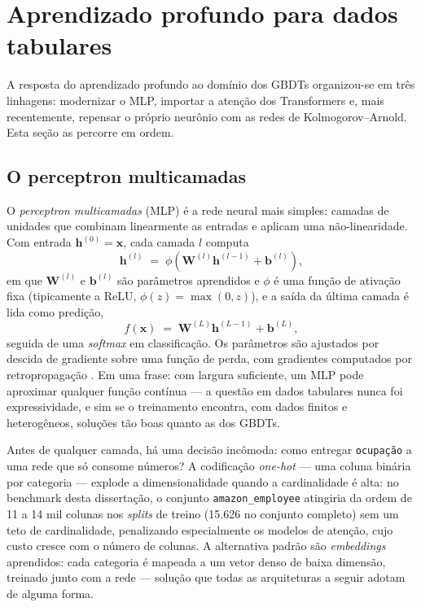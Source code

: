\section{Aprendizado profundo para dados tabulares}
\label{sec:fund-dl}

A resposta do aprendizado profundo ao domínio dos GBDTs organizou-se em
três linhagens: modernizar o MLP, importar a atenção dos Transformers e,
mais recentemente, repensar o próprio neurônio com as redes de
Kolmogorov--Arnold. Esta seção as percorre em ordem.

\subsection{O perceptron multicamadas}

O \emph{perceptron multicamadas} (MLP) é a rede neural mais simples:
camadas de unidades que combinam linearmente as entradas e aplicam uma
não-linearidade. Com entrada $\mathbf{h}^{(0)} = \mathbf{x}$, cada camada
$l$ computa
\begin{equation}
  \mathbf{h}^{(l)} \;=\; \phi\!\left(\mathbf{W}^{(l)} \mathbf{h}^{(l-1)}
  + \mathbf{b}^{(l)}\right),
  \label{eq:mlp-camada}
\end{equation}
em que $\mathbf{W}^{(l)}$ e $\mathbf{b}^{(l)}$ são parâmetros aprendidos e
$\phi$ é uma função de ativação fixa (tipicamente a ReLU,
$\phi(z) = \max(0, z)$), e a saída da última camada é lida como predição,
\begin{equation}
  f(\mathbf{x}) \;=\; \mathbf{W}^{(L)} \mathbf{h}^{(L-1)} + \mathbf{b}^{(L)},
  \label{eq:mlp-saida}
\end{equation}
seguida de uma \emph{softmax} em classificação. Os parâmetros são ajustados
por descida de gradiente sobre uma função de perda, com gradientes
computados por retropropagação \citep{rumelhart1986}. Em uma frase: com largura suficiente, um
MLP pode aproximar qualquer função contínua \citep{hornik1989} --- a questão em dados
tabulares nunca foi expressividade, e sim se o treinamento encontra, com
dados finitos e heterogêneos, soluções tão boas quanto as dos GBDTs.

Antes de qualquer camada, há
uma decisão incômoda: como entregar \texttt{ocupação} a uma rede que só
consome números? A codificação \emph{one-hot} --- uma coluna binária por
categoria --- explode a dimensionalidade quando a cardinalidade é alta: no
benchmark desta dissertação, o conjunto \texttt{amazon\_\allowbreak employee} atingiria
da ordem de 11 a 14 mil colunas nos \emph{splits} de treino (15.626 no
conjunto completo) sem um teto de
cardinalidade, penalizando
especialmente os modelos de atenção, cujo custo cresce com o número de
colunas. A alternativa padrão são \emph{embeddings} aprendidos: cada
categoria é mapeada a um vetor denso de baixa dimensão, treinado junto com
a rede --- solução que todas as arquiteturas a seguir adotam de alguma
forma.

